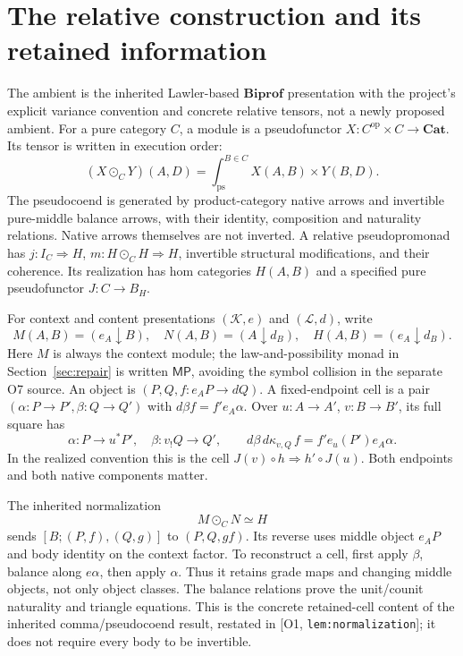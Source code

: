 \documentclass[11pt,a4paper]{article}
\theoremstyle{definition}
\newcommand{\Cat}{\mathbf{Cat}}
\newcommand{\Biprof}{\mathbf{Biprof}}
\newcommand{\Lc}{\mathcal L}
\newcommand{\MayProb}{\mathsf{MP}}
\newcommand{\Addr}[2]{\textup{[#1, \texttt{#2}]}}
\begin{document}
\section{The relative construction and its retained information}\label{sec:spine}

The ambient is the inherited Lawler-based \(\Biprof\) presentation
with the project's explicit variance convention and concrete relative
tensors, not a newly proposed ambient. For a pure category \(C\), a module
is a pseudofunctor
\(X:C^{\mathrm{op}}\times C\to\Cat\). Its tensor is written in
execution order:
\[
 (X\odot_CY)(A,D)=\int^{B\in C}_{\mathrm{ps}}
                       X(A,B)\times Y(B,D).
\]
The pseudocoend is generated by product-category native arrows and
invertible pure-middle balance arrows, with their identity, composition
and naturality relations. Native arrows themselves are not inverted.
A relative pseudopromonad has \(j:I_C\Rightarrow H\),
\(m:H\odot_CH\Rightarrow H\), invertible structural modifications,
and their coherence. Its realization has hom categories \(H(A,B)\) and
a specified pure pseudofunctor \(J:C\to B_H\).

For context and content presentations \((\mathcal K,e)\) and
\((\Lc,d)\), write
\[
 M(A,B)=(e_A\downarrow B),\quad
 N(A,B)=(A\downarrow d_B),\quad
 H(A,B)=(e_A\downarrow d_B).
\]
Here \(M\) is always the context module; the law-and-possibility monad
in Section~\ref{sec:repair} is written \(\MayProb\), avoiding the
symbol collision in the separate O7 source.
An object is \((P,Q,f:e_AP\to dQ)\). A fixed-endpoint cell is a pair
\((\alpha:P\to P',\beta:Q\to Q')\) with
\(d\beta f=f'e_A\alpha\). Over \(u:A\to A'\), \(v:B\to B'\),
its full square has
\begin{equation}\label{eq:square}
 \alpha:P\to u^*P',\quad \beta:v_!Q\to Q',\qquad
 d\beta\,d\kappa_{v,Q}\,f=f'e_u(P')e_A\alpha.
\end{equation}
In the realized convention this is the cell
\(J(v)\circ h\Rightarrow h'\circ J(u)\). Both endpoints and both
native components matter.

The inherited normalization
\[
 M\odot_CN\simeq H
\]
sends \([B;(P,f),(Q,g)]\) to \((P,Q,gf)\). Its reverse uses middle
object \(e_AP\) and body identity on the context factor. To reconstruct
a cell, first apply \(\beta\), balance along \(e\alpha\), then apply
\(\alpha\). Thus it retains grade maps and changing middle objects,
not only object classes. The balance relations prove the unit/counit
naturality and triangle equations. This is the concrete retained-cell
content of the inherited comma/pseudocoend result, restated in
\Addr{O1}{lem:normalization}; it does not require every body to be invertible.
\end{document}
